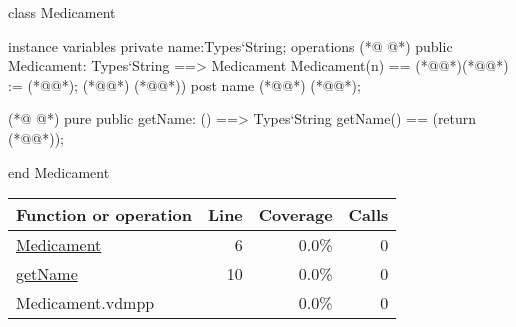\begin{vdmpp}[breaklines=true]
class Medicament

instance variables
  private name:Types`String;
operations
(*@
\label{Medicament:6}
@*)
 public Medicament: Types`String ==> Medicament
  Medicament(n) == (*@\vdmnotcovered{(}@*)(*@@*) := (*@@*); (*@@*) (*@@*))
 post name (*@\vdmnotcovered{=}@*) (*@@*);
 
(*@
\label{getName:10}
@*)
 pure public getName: () ==> Types`String
  getName() == (return (*@@*));

end Medicament
\end{vdmpp}
\bigskip
\begin{longtable}{|l|r|r|r|}
\hline
Function or operation & Line & Coverage & Calls \\
\hline
\hline
\hyperref[Medicament:6]{Medicament} & 6&0.0\% & 0 \\
\hline
\hyperref[getName:10]{getName} & 10&0.0\% & 0 \\
\hline
\hline
Medicament.vdmpp & & 0.0\% & 0 \\
\hline
\end{longtable}


